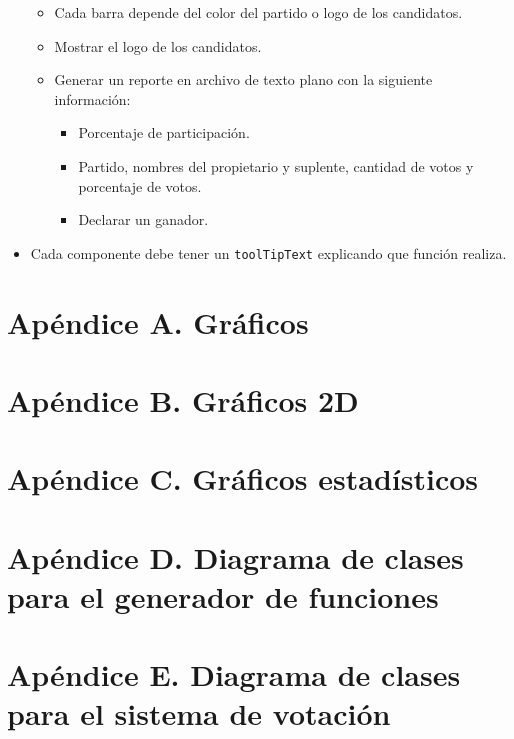 \documentclass[11pt]{article}
\begin{document}
\begin{itemize}
\begin{itemize}
\item Cada barra depende del color del partido o logo de los candidatos.
\item Mostrar el logo de los candidatos.
\item Generar un reporte en archivo de texto plano con la siguiente información:
\begin{itemize}
\item Porcentaje de participación.
\item Partido, nombres del propietario y suplente, cantidad de votos y porcentaje de votos.
\item Declarar un ganador.
\end{itemize}
\end{itemize} 
\item Cada componente debe tener un \texttt{toolTipText} explicando que función realiza.
\end{itemize}
\newpage


\section*{Apéndice A. Gráficos}

\newpage
\section*{Apéndice B. Gráficos 2D}

\newpage
\section*{Apéndice C. Gráficos estadísticos}

\newpage

\section*{Apéndice D. Diagrama de clases para el generador de funciones}

\newpage
\section*{Apéndice E. Diagrama de clases para el sistema de votación}

\newpage


\newpage


\end{document}
